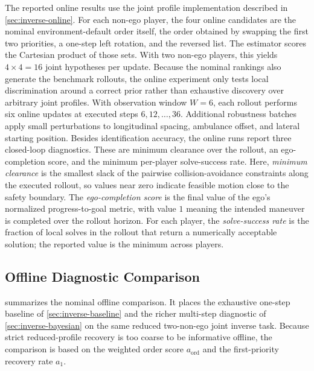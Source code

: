 The reported online results use the joint profile implementation described in \cref{sec:inverse-online}.
For each non-ego player, the four online candidates are the nominal environment-default order itself, the order obtained
by swapping the first two priorities, a one-step left rotation, and the reversed list.
The estimator scores the Cartesian product of those sets.
With two non-ego players, this yields $4 \times 4 = 16$ joint hypotheses per update.
Because the nominal rankings also generate the benchmark rollouts, the online experiment only tests
local discrimination around a correct prior rather than exhaustive discovery over arbitrary joint
profiles.
With observation window $W = 6$, each rollout performs six online updates at executed steps $6, 12, \ldots, 36$.
Additional robustness batches apply small perturbations to longitudinal spacing, ambulance offset,
and lateral starting position.
Besides identification accuracy, the online runs report three closed-loop diagnostics. These are
minimum clearance over the rollout, an ego-completion score, and the minimum per-player
solve-success rate.
Here, \emph{minimum clearance} is the smallest slack of the pairwise collision-avoidance constraints
along the executed rollout, so values near zero indicate feasible motion close to the safety boundary.
The \emph{ego-completion score} is the final value of the ego's normalized progress-to-goal metric, with
value $1$ meaning the intended maneuver is completed over the rollout horizon. For each player, the
\emph{solve-success rate} is the fraction of local solves in the rollout that return a numerically acceptable
solution; the reported value is the minimum across players.
\enlargethispage{2\baselineskip}

\subsection{Offline Diagnostic Comparison}

 summarizes the nominal offline comparison.
It places the exhaustive one-step baseline of \cref{sec:inverse-baseline} and the richer multi-step
diagnostic of \cref{sec:inverse-bayesian} on the same reduced two-non-ego joint inverse task.
Because strict reduced-profile recovery is too coarse to be informative offline, the comparison is based on the
weighted order score $a_{\mathrm{ord}}$ and the first-priority recovery rate $a_1$.

